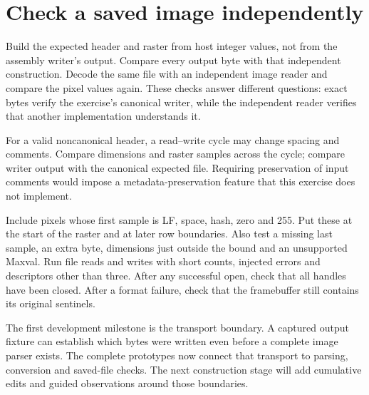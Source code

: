 \section{Check a saved image independently}
Build the expected header and raster from host integer values, not from the assembly
writer's output. Compare every output byte with that independent construction. Decode
the same file with an independent image reader and compare the pixel values again.
These checks answer different questions: exact bytes verify the exercise's canonical
writer, while the independent reader verifies that another implementation understands it.

For a valid noncanonical header, a read--write cycle may change spacing and comments.
Compare dimensions and raster samples across the cycle; compare writer output with the
canonical expected file. Requiring preservation of input comments would impose a
metadata-preservation feature that this exercise does not implement.

Include pixels whose first sample is LF, space, hash, zero and 255. Put these at the
start of the raster and at later row boundaries. Also test a missing last sample, an
extra byte, dimensions just outside the bound and an unsupported Maxval. Run file reads
and writes with short counts, injected errors and descriptors other than three. After
any successful open, check that all handles have been closed. After a format failure,
check that the framebuffer still contains its original sentinels.

The first development milestone is the transport boundary. A captured output fixture
can establish which bytes were written even before a complete image parser exists.
The complete prototypes now connect that transport to parsing, conversion and saved-file
checks. The next construction stage will add cumulative edits and guided observations
around those boundaries.
